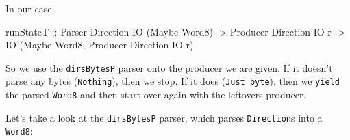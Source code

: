 \documentclass[]{article}
\newenvironment{Shaded}{}{}
\newcommand{\KeywordTok}[1]{\textcolor[rgb]{0.00,0.44,0.13}{\textbf{#1}}}
\newcommand{\DataTypeTok}[1]{\textcolor[rgb]{0.56,0.13,0.00}{#1}}
\newcommand{\DecValTok}[1]{\textcolor[rgb]{0.25,0.63,0.44}{#1}}
\newcommand{\CommentTok}[1]{\textcolor[rgb]{0.38,0.63,0.69}{\textit{#1}}}
\newcommand{\OtherTok}[1]{\textcolor[rgb]{0.00,0.44,0.13}{#1}}
\newcommand{\FunctionTok}[1]{\textcolor[rgb]{0.02,0.16,0.49}{#1}}
\newcommand{\NormalTok}[1]{#1}
\begin{document}
In our case:

\begin{Shaded}
\begin{Highlighting}[]
\OtherTok{runStateT ::} \DataTypeTok{Parser}   \DataTypeTok{Direction} \DataTypeTok{IO}\NormalTok{ (}\DataTypeTok{Maybe} \DataTypeTok{Word8}\NormalTok{)}
          \OtherTok{->} \DataTypeTok{Producer} \DataTypeTok{Direction} \DataTypeTok{IO}\NormalTok{ r}
          \OtherTok{->} \DataTypeTok{IO}\NormalTok{ (}\DataTypeTok{Maybe} \DataTypeTok{Word8}\NormalTok{, }\DataTypeTok{Producer} \DataTypeTok{Direction} \DataTypeTok{IO}\NormalTok{ r)}
\end{Highlighting}
\end{Shaded}

So we use the \texttt{dirsBytesP} parser onto the producer we are given. If it
doesn't parse any bytes (\texttt{Nothing}), then we stop. If it does
(\texttt{Just\ byte}), then we \texttt{yield} the parsed \texttt{Word8} and then
start over again with the leftovers producer.

Let's take a look at the \texttt{dirsBytesP} parser, which parses
\texttt{Direction}s into a \texttt{Word8}:

\begin{Shaded}
\end{Shaded}
\end{document}
